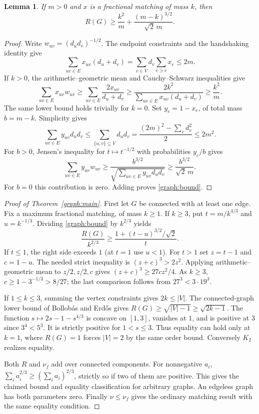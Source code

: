 \documentclass[11pt]{article}
\newtheorem{lemma}[theorem]{Lemma}
\theoremstyle{remark}\newtheorem{remark}[theorem]{Remark}
\begin{document}
\begin{lemma}\label{graph:split}
If $m>0$ and $x$ is a fractional matching of mass $k$, then
\begin{equation}\label{graph:bound}
 R(G)\ge \frac{k^2}{m}+\frac{(m-k)^{3/2}}{\sqrt{2}\,m}.
\end{equation}
\end{lemma}
\begin{proof}
Write $w_{uv}=(d_ud_v)^{-1/2}$. The endpoint constraints and the
handshaking identity give
\[
 \sum_{uv\in E}x_{uv}(d_u+d_v)
 =\sum_{v\in V} d_v\sum_{e\ni v}x_e\le 2m .
\]
If $k>0$, the arithmetic--geometric mean and Cauchy--Schwarz inequalities give
\[
 \sum_{uv\in E}x_{uv}w_{uv}
 \ge \sum_{uv\in E}\frac{2x_{uv}}{d_u+d_v}
 \ge \frac{2k^2}{\sum_{uv\in E}x_{uv}(d_u+d_v)}
 \ge \frac{k^2}{m}.
\]
The same lower bound holds trivially for $k=0$. Set $y_e=1-x_e$,
of total mass $b=m-k$. Simplicity gives
\[
 \sum_{uv\in E}y_{uv}d_ud_v\le
 \sum_{\{u,v\}\subseteq V}d_ud_v
 =\frac{(2m)^2-\sum_v d_v^2}{2}\le2m^2 .
\]
For $b>0$, Jensen's inequality for $t\mapsto t^{-1/2}$ with
probabilities $y_e/b$ gives
\[
 \sum_{uv\in E}y_{uv}w_{uv}\ge
 \frac{b^{3/2}}{\sqrt{\sum_{uv\in E}y_{uv}d_ud_v}}
 \ge \frac{b^{3/2}}{\sqrt{2}\,m}.
\]
For $b=0$ this contribution is zero. Adding proves \eqref{graph:bound}.
\end{proof}

\begin{proof}[Proof of Theorem~\ref{graph:main}]
First let $G$ be connected with at least one edge. Fix a maximum
fractional matching, of mass $k\ge1$.
If $k\ge3$, put $t=m/k^{4/3}$ and $u=k^{-1/3}$. Dividing
\eqref{graph:bound} by $k^{2/3}$ yields
\[
 \frac{R(G)}{k^{2/3}}\ge\frac{1+(t-u)^{3/2}/\sqrt{2}}{t}.
\]
If $t\le1$, the right side exceeds $1$ (at $t=1$ use $u<1$).
For $t>1$ set $z=t-1$ and $c=1-u$. The needed strict inequality
is $(z+c)^3>2z^2$. Applying arithmetic--geometric mean to
$z/2,z/2,c$ gives $(z+c)^3\ge 27cz^2/4$.
As $k\ge3$, $c\ge1-3^{-1/3}>8/27$; the last comparison follows
from $27^3<3\cdot19^3$.

If $1\le k\le3$, summing the vertex constraints gives
$2k\le |V|$. The connected-graph lower bound of Bollob\'as and
Erd\H{o}s \cite{BE} gives $R(G)\ge\sqrt{|V|-1}\ge\sqrt{2k-1}$.
The function $s\mapsto 2s-1-s^{4/3}$ is concave on $[1,3]$,
vanishes at $1$, and is positive at $3$ since $3^4<5^3$.
It is strictly positive for $1<s\le3$. Thus equality can hold only
at $k=1$, where $R(G)=1$ forces $|V|=2$ by the same order bound.
Conversely $K_2$ realizes equality.

Both $R$ and $\nu_f$ add over connected components.
For nonnegative $a_i$, $\sum_i a_i^{2/3}\ge(\sum_i a_i)^{2/3}$,
strictly so if two of them are positive. This gives the claimed bound
and equality classification for arbitrary graphs. An edgeless graph
has both parameters zero. Finally $\nu\le\nu_f$ gives the ordinary
matching result with the same equality condition.
\end{proof}
\end{document}
